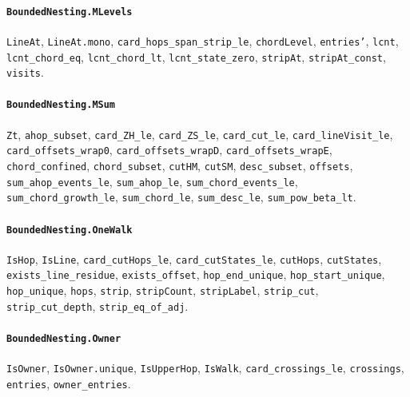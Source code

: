 \paragraph{\texttt{BoundedNesting.MLevels}}
{\small\raggedright \texttt{LineAt}, \texttt{LineAt.mono}, \texttt{card\_hops\_span\_strip\_le}, \texttt{chordLevel}, \texttt{entries'}, \texttt{lcnt}, \texttt{lcnt\_chord\_eq}, \texttt{lcnt\_chord\_lt}, \texttt{lcnt\_state\_zero}, \texttt{stripAt}, \texttt{stripAt\_const}, \texttt{visits}.\par}

\paragraph{\texttt{BoundedNesting.MSum}}
{\small\raggedright \texttt{Zt}, \texttt{ahop\_subset}, \texttt{card\_ZH\_le}, \texttt{card\_ZS\_le}, \texttt{card\_cut\_le}, \texttt{card\_lineVisit\_le}, \texttt{card\_offsets\_wrap0}, \texttt{card\_offsets\_wrapD}, \texttt{card\_offsets\_wrapE}, \texttt{chord\_confined}, \texttt{chord\_subset}, \texttt{cutHM}, \texttt{cutSM}, \texttt{desc\_subset}, \texttt{offsets}, \texttt{sum\_ahop\_events\_le}, \texttt{sum\_ahop\_le}, \texttt{sum\_chord\_events\_le}, \texttt{sum\_chord\_growth\_le}, \texttt{sum\_chord\_le}, \texttt{sum\_desc\_le}, \texttt{sum\_pow\_beta\_lt}.\par}

\paragraph{\texttt{BoundedNesting.OneWalk}}
{\small\raggedright \texttt{IsHop}, \texttt{IsLine}, \texttt{card\_cutHops\_le}, \texttt{card\_cutStates\_le}, \texttt{cutHops}, \texttt{cutStates}, \texttt{exists\_line\_residue}, \texttt{exists\_offset}, \texttt{hop\_end\_unique}, \texttt{hop\_start\_unique}, \texttt{hop\_unique}, \texttt{hops}, \texttt{strip}, \texttt{stripCount}, \texttt{stripLabel}, \texttt{strip\_cut}, \texttt{strip\_cut\_depth}, \texttt{strip\_eq\_of\_adj}.\par}

\paragraph{\texttt{BoundedNesting.Owner}}
{\small\raggedright \texttt{IsOwner}, \texttt{IsOwner.unique}, \texttt{IsUpperHop}, \texttt{IsWalk}, \texttt{card\_crossings\_le}, \texttt{crossings}, \texttt{entries}, \texttt{owner\_entries}.\par}

